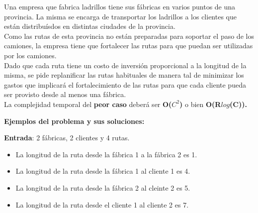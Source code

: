 \documentclass[a4paper, 10pt, twoside]{article}
\begin{document}
Una empresa que fabrica ladrillos tiene sus fábricas en varios puntos de una provincia. La misma se encarga de transportar los ladrillos a los clientes que están distribuísdos en distintas ciudades de la provincia.\\
Como las rutas de esta provincia no están preparadas para soportar el paso de los camiones, la empresa tiene que fortalecer las rutas para que puedan ser utilizadas por los camiones.\\
Dado que cada ruta tiene un costo de inversión proporcional a la longitud de la misma, se pide replanificar las rutas habituales de manera tal de minimizar los gastos que implicará el fortalecimiento de las rutas para que cada cliente pueda ser provisto desde al menos una fábrica.\\
La complejidad temporal del \textbf{peor caso} deberá ser \textbf{O($C^2$)} o bien \textbf{O(R$log$(C)).}

\textbf{Ejemplos del problema y sus soluciones:}

\textbf{Entrada}: 2 fábricas, 2 clientes y 4 rutas.
\begin{itemize}
\item{La longitud de la ruta desde la fábrica 1 a la fábrica 2 es 1.}
\item{La longitud de la ruta desde la fábrica 1 al cliente 1 es 4.}
\item{La longitud de la ruta desde la fábrica 2 al cleinte 2 es 5.}
\item{La longitud de la ruta desde el cliente 1 al cliente 2 es 7.}
\end{itemize}
\end{document}
